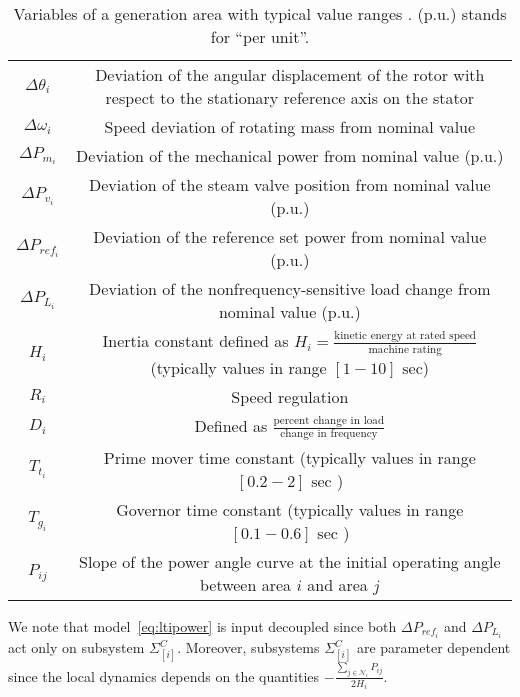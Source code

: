 \documentclass[a4paper]{article}
\newcommand{\NN}{{\mathcal N}}
\newcommand{\subss}[2]{#1_{[#2]}}
\begin{document}
          \begin{table}[!ht]
            \footnotesize
            \centering
            \begin{tabular}{|c|c|}
              \hline
              $\Delta\theta_i$ & Deviation of the angular displacement of the rotor with respect to the stationary reference axis on the stator \\
              $\Delta\omega_i$ & Speed deviation of rotating mass from nominal value\\
              $\Delta P_{m_i}$ & Deviation of the mechanical power from nominal value (p.u.)\\
              $\Delta P_{v_i}$ & Deviation of the steam valve position from nominal value (p.u.)\\
              $\Delta P_{ref_i}$ & Deviation of the reference set power from nominal value (p.u.)\\
              $\Delta P_{L_i}$ & Deviation of the nonfrequency-sensitive load change from nominal value (p.u.)\\
              $H_i$ & Inertia constant defined as $H_i=\frac{\mbox{kinetic energy at rated speed}}{\mbox{machine rating}}$ (typically values in range $[1-10]\mbox{ sec}$) \\
              $R_i$ & Speed regulation \\
              $D_i$ & Defined as $\frac{\mbox{percent change in load}}{\mbox{change in frequency}}$ \\
              $T_{t_i}$ & Prime mover time constant (typically values in range $[0.2-2]\mbox{ sec }$)\\
              $T_{g_i}$ & Governor time constant (typically values in range $[0.1-0.6]\mbox{ sec }$) \\
              $P_{ij}$ & Slope of the power angle curve at the initial operating angle between area $i$ and area $j$ \\
              \hline
            \end{tabular}
            \caption{Variables of a generation area with typical value ranges \cite{Saadat2002}. (p.u.) stands for ``per unit''.}
            \label{tab:networkparameter}
          \end{table}
          \normalsize

          We note that model~\eqref{eq:ltipower} is input decoupled since both $\Delta P_{ref_i}$ and $\Delta P_{L_i}$ act only on subsystem $\subss{\Sigma}{i}^C$. Moreover, subsystems $\subss\Sigma i^C$ are parameter dependent since the local dynamics depends on the quantities $-\frac{\sum_{j\in\NN_i}{P_{{ij}}} }{2H_i}$. 
\end{document}
